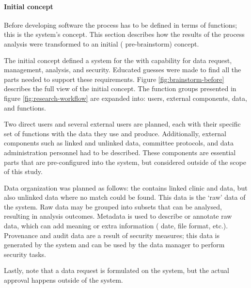 \paragraph{Initial concept}
Before developing software the process has to be defined in terms of functions; this is the system's concept.
This section describes how the results of the process analysis 
were transformed to an initial (\ie{} pre-brainstorm) concept.

The initial concept defined a system for the \projectdata{} with capability for data request, management, analysis, and security.
Educated guesses were made to find all the parts needed to support these requirements.
Figure \ref{fig:brainstorm-before} describes the full view of the initial concept. 
The function groups presented in figure \ref{fig:research-workflow} are expanded into: users, external components, data, and functions.

Two direct users and several external users are planned, each with their specific set of functions with the data they use and produce.
Additionally, external components such as linked and unlinked data, committee protocols, and data administration personnel had to be described.
These components are essential parts that are pre-configured into the system, but considered outside of the scope of this study.

Data organization was planned as follows: the \projectdata{} contains linked clinic and \PRN{} data, but also unlinked data where no match could be found.
This data is the `raw' data of the system.
Raw data may be grouped into subsets that can be analysed, resulting in analysis outcomes.
Metadata is used to describe or annotate raw data, which can add meaning or extra information (\eg{} date, file format, etc.).
Provenance and audit data are a result of security measures; this data is generated by the system and can be used by the data manager to perform security tasks.

Lastly, note that a data request is formulated on the system, but the actual approval happens outside of the system.

